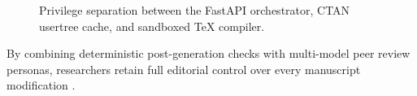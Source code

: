 \begin{figure}[htbp]
  \centering
  \caption{Privilege separation between the FastAPI orchestrator, CTAN usertree cache, and sandboxed TeX compiler.}
  \label{fig:pipeline_arch}
\end{figure}

By combining deterministic post-generation checks with multi-model peer review personas, researchers retain full editorial control over every manuscript modification \cite{vaswani2017attention}.
